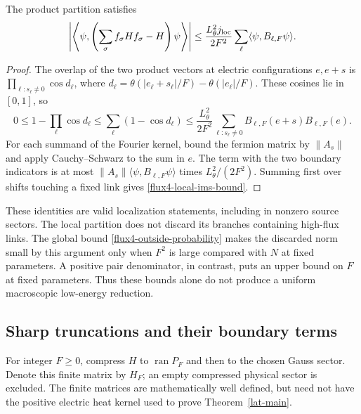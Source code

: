 \begin{lemma}
\label{flux4-local-ims}
The product partition satisfies
\begin{equation}
 \left|\left\langle\psi,
 \left(\sum_\sigma f_\sigma Hf_\sigma-H\right)\psi\right\rangle\right|
 \le\frac{L_\theta^2j_{\rm loc}}{2F^2}
       \sum_\ell\langle\psi,B_{\ell,F}\psi\rangle.
 \label{flux4-local-ims-bound}
\end{equation}
\end{lemma}
\begin{proof}
The overlap of the two product vectors at electric configurations
$e,e+s$ is $\prod_{\ell:s_\ell\ne0}\cos d_\ell$, where
$d_\ell=\theta(|e_\ell+s_\ell|/F)-\theta(|e_\ell|/F)$.
These cosines lie in $[0,1]$, so
\[
 0\le1-\prod_\ell\cos d_\ell
 \le\sum_\ell(1-\cos d_\ell)
 \le\frac{L_\theta^2}{2F^2}
       \sum_{\ell:s_\ell\ne0}
       B_{\ell,F}(e+s)B_{\ell,F}(e).
\]
For each summand of the Fourier kernel, bound the fermion matrix by
$\|A_s\|$ and apply Cauchy--Schwarz to the sum in $e$.  The term
with the two boundary indicators is at most
$\|A_s\|\langle\psi,B_{\ell,F}\psi\rangle$ times
$L_\theta^2/(2F^2)$.  Summing first over shifts touching a fixed link
gives \eqref{flux4-local-ims-bound}.
\end{proof}

These identities are valid localization statements, including in
nonzero source sectors.  The local partition does not discard its
branches containing high-flux links.  The global bound
\eqref{flux4-outside-probability} makes the discarded norm small by
this argument only when $F^2$ is large compared with $N$ at fixed
parameters.  A positive pair denominator, in contrast, puts an upper
bound on $F$ at fixed parameters.  Thus these bounds alone do not
produce a uniform macroscopic low-energy reduction.

\subsection{Sharp truncations and their boundary terms}

For integer $F\ge0$, compress $H$ to $\operatorname{ran}P_F$ and
then to the chosen Gauss sector.  Denote this finite matrix by $H_F$;
an empty compressed physical sector is excluded.  The finite matrices
are mathematically well defined, but need not have the positive
electric heat kernel used to prove Theorem~\ref{lat-main}.

